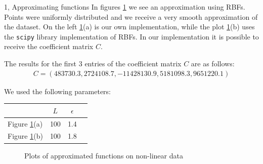 \begin{task}{1, Approximating functions}
In figures \ref{fig:t1_3} we see an approximation using RBFs. Points were uniformly distributed and we receive a very smooth approximation of the dataset. On the left \ref{fig:t1_3}(a) is our own implementation, while the plot \ref{fig:t1_3}(b) uses the \verb|scipy| library implementation of RBFs. In our implementation it is possible to receive the coefficient matrix $C$.\\

\begin{minipage}{\linewidth}%
The results for the first 3 entries of the coefficient matrix $C$ are as follows:
\begin{align*}
    C= (483730.3, 2724108.7, -11428130.9, 5181098.3, 9651220.1)
\end{align*}

We used the following parameters:
\begin{center}
    \bgroup
    \def\arraystretch{1.5}
    \begin{tabular}{ |l|c|c|c| }
    \hline
    & $L$  & $\epsilon$\\
    \hline
    Figure \ref{fig:t1_3}(a) & 100 &  1.4\\
    \hline
    Figure \ref{fig:t1_3}(b) & 100 & 1.8\\
    \hline
    \end{tabular}
    \egroup
\end{center}
\end{minipage}

\begin{figure}[H]
\centering
{}
\caption{Plots of approximated functions on non-linear data}
\label{fig:t1_3}
\end{figure}


\end{task}
